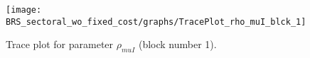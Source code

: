 \begin{figure}[H]
\centering
  \texttt{[image: BRS\_sectoral\_wo\_fixed\_cost/graphs/TracePlot\_rho\_muI\_blck\_1]}\\
    \caption{Trace plot for parameter ${\rho_{muI}}$ (block number 1).}
\end{figure}
